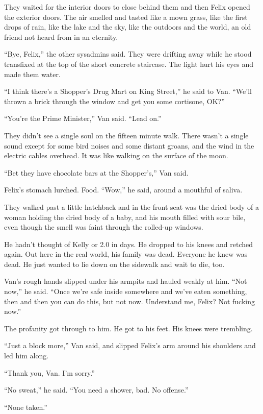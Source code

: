 They waited for the interior doors to close behind them and then
Felix opened the exterior doors. The air smelled and tasted like a
mown grass, like the first drops of rain, like the lake and the
sky, like the outdoors and the world, an old friend not heard from
in an eternity.

“Bye, Felix,” the other sysadmins said. They were drifting away
while he stood transfixed at the top of the short concrete
staircase. The light hurt his eyes and made them water.

“I think there’s a Shopper’s Drug Mart on King Street,” he said to
Van. “We’ll thrown a brick through the window and get you some
cortisone, OK?”

“You’re the Prime Minister,” Van said. “Lead on.”

\tb

They didn’t see a single soul on the fifteen minute walk. There
wasn’t a single sound except for some bird noises and some distant
groans, and the wind in the electric cables overhead. It was like
walking on the surface of the moon.

“Bet they have chocolate bars at the Shopper’s,” Van said.

Felix’s stomach lurched. Food. “Wow,” he said, around a mouthful of
saliva.

They walked past a little hatchback and in the front seat was the
dried body of a woman holding the dried body of a baby, and his
mouth filled with sour bile, even though the smell was faint
through the rolled-up windows.

He hadn’t thought of Kelly or 2.0 in days. He dropped to his knees
and retched again. Out here in the real world, his family was dead.
Everyone he knew was dead. He just wanted to lie down on the
sidewalk and wait to die, too.

Van’s rough hands slipped under his armpits and hauled weakly at
him. “Not now,” he said. “Once we’re safe inside somewhere and
we’ve eaten something, then and then you can do this, but not now.
Understand me, Felix? Not fucking now.”

The profanity got through to him. He got to his feet. His knees
were trembling.

“Just a block more,” Van said, and slipped Felix’s arm around his
shoulders and led him along.

“Thank you, Van. I’m sorry.”

“No sweat,” he said. “You need a shower, bad. No offense.”

“None taken.”

